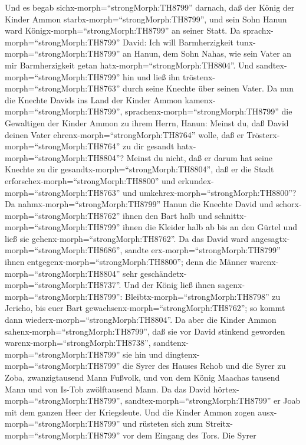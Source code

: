  Und es begab sichx-morph=``strongMorph:TH8799'' darnach,
daß der König der Kinder Ammon starbx-morph=``strongMorph:TH8799'', und
sein Sohn Hanun ward Königx-morph=``strongMorph:TH8799'' an seiner
Statt.  Da sprachx-morph=``strongMorph:TH8799'' David: Ich
will Barmherzigkeit tunx-morph=``strongMorph:TH8799'' an Hanun, dem Sohn
Nahas, wie sein Vater an mir Barmherzigkeit getan
hatx-morph=``strongMorph:TH8804''. Und
sandtex-morph=``strongMorph:TH8799'' hin und ließ ihn
tröstenx-morph=``strongMorph:TH8763'' durch seine Knechte über seinen
Vater. Da nun die Knechte Davids ins Land der Kinder Ammon
kamenx-morph=``strongMorph:TH8799'', 
sprachenx-morph=``strongMorph:TH8799'' die Gewaltigen der Kinder Ammon
zu ihrem Herrn, Hanun: Meinst du, daß David deinen Vater
ehrenx-morph=``strongMorph:TH8764'' wolle, daß er
Trösterx-morph=``strongMorph:TH8764'' zu dir gesandt
hatx-morph=``strongMorph:TH8804''? Meinst du nicht, daß er darum hat
seine Knechte zu dir gesandtx-morph=``strongMorph:TH8804'', daß er die
Stadt erforschex-morph=``strongMorph:TH8800'' und
erkundex-morph=``strongMorph:TH8763'' und
umkehrex-morph=``strongMorph:TH8800''?  Da
nahmx-morph=``strongMorph:TH8799'' Hanun die Knechte David und
schorx-morph=``strongMorph:TH8762'' ihnen den Bart halb und
schnittx-morph=``strongMorph:TH8799'' ihnen die Kleider halb ab bis an
den Gürtel und ließ sie gehenx-morph=``strongMorph:TH8762''.
 Da das David ward angesagtx-morph=``strongMorph:TH8686'',
sandte erx-morph=``strongMorph:TH8799'' ihnen
entgegenx-morph=``strongMorph:TH8800''; denn die Männer
warenx-morph=``strongMorph:TH8804'' sehr
geschändetx-morph=``strongMorph:TH8737''. Und der König ließ ihnen
sagenx-morph=``strongMorph:TH8799'':
Bleibtx-morph=``strongMorph:TH8798'' zu Jericho, bis euer Bart
gewachsenx-morph=``strongMorph:TH8762''; so kommt dann
wiederx-morph=``strongMorph:TH8804''.  Da aber die Kinder
Ammon sahenx-morph=``strongMorph:TH8799'', daß sie vor David stinkend
geworden warenx-morph=``strongMorph:TH8738'',
sandtenx-morph=``strongMorph:TH8799'' sie hin und
dingtenx-morph=``strongMorph:TH8799'' die Syrer des Hauses Rehob und die
Syrer zu Zoba, zwanzigtausend Mann Fußvolk, und von dem König Maachas
tausend Mann und von Is-Tob zwölftausend Mann.  Da das David
hörtex-morph=``strongMorph:TH8799'',
sandtex-morph=``strongMorph:TH8799'' er Joab mit dem ganzen Heer der
Kriegsleute.  Und die Kinder Ammon zogen
ausx-morph=``strongMorph:TH8799'' und rüsteten sich zum
Streitx-morph=``strongMorph:TH8799'' vor dem Eingang des Tors. Die Syrer
